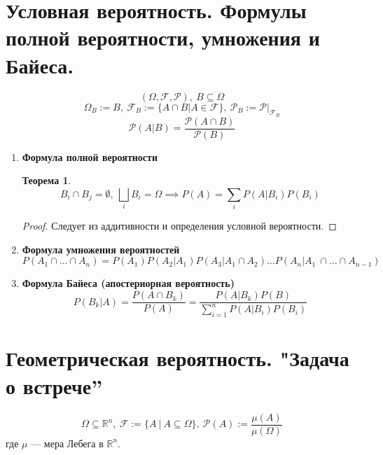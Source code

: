 \documentclass[11pt,a4paper]{report}
\def\salg{\mathcal{F}}
\def\prob{\mathcal{P}}
\theoremstyle{definition}
\theoremstyle{definition}
\newtheorem{theorem}{Теорема}[section]
\theoremstyle{definition}
\begin{document}
	\section{Условная вероятность. Формулы полной вероятности, умножения и Байеса.}
		\[ (\Omega, \salg, \prob),\ B \subseteq \Omega\]
		\[ \Omega_{B} := B,\ \salg_{B} := \{A \cap B | A \in \salg\},\ \prob_{B} := \prob|_{\salg_{B}}\]
		\[\prob(A | B) = \frac{\prob(A \cap B)}{\prob(B)} \]
	    \begin{enumerate}[1.]
	    \item \textbf{Формула полной вероятности}
		   \begin{theorem}
			   	\[ B_{i} \cap B_{j} = \emptyset,\ \bigsqcup_{i} B_{i} = \Omega \implies P(A) = \sum_{i} P(A | B_{i}) 	P(B_{i}) \]
		   \end{theorem}
		   \begin{proof}
			   	Следует из аддитивности и определения условной вероятности.
		   \end{proof}
		\item \textbf{Формула умножения вероятностей}
			\[P(A_{1} \cap \dots \cap A_{n}) = P(A_{1}) P(A_{2} | A_{1}) P (A_{3} | A_{1} \cap A_{2}) \dots P(A_{n} | A_{1} \ \cap \dots \cap A_{n-1}) \]
		\item \textbf{Формула Байеса (апостериорная вероятность)}
			\[P(B_{k} | A) = \frac{P(A \cap B_{k})}{P(A)} = \frac{P(A | B_{k}) P (B)}{\sum_{i=1}^{n}{P(A|B_{i})P(B_{i})}} \]
		\end{enumerate}
	\section{Геометрическая вероятность. "Задача о встрече”}
		\[ \Omega \subseteq \mathbb{R}^{n},\ \salg := \{A\ |\ A \subseteq \Omega \},\ \prob(A) := \frac{\mu(A)}{\mu(\Omega)}\] где $ \mu $ — мера Лебега в $ \mathbb{R}^{n} $.
\end{document}
